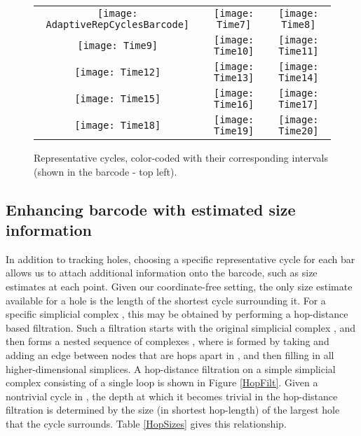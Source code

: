 \documentclass[12pt]{article}
\begin{document}
\begin{figure}[htp]
\begin{center}
\begin{tabular}{ccc}
\texttt{[image: AdaptiveRepCyclesBarcode]} & \texttt{[image: Time7]} & \texttt{[image: Time8]} \\
\texttt{[image: Time9]} & \texttt{[image: Time10]} & \texttt{[image: Time11]}  \\
\texttt{[image: Time12]} & \texttt{[image: Time13]} & \texttt{[image: Time14]} \\
\texttt{[image: Time15]} & \texttt{[image: Time16]} & \texttt{[image: Time17]} \\
\texttt{[image: Time18]} & \texttt{[image: Time19]} & \texttt{[image: Time20]} \\
\end{tabular}
\end{center}
\caption{Representative cycles, color-coded with their corresponding intervals (shown in the barcode - top left). \label{DenseNetwork}}
\end{figure}

\subsection{Enhancing barcode with estimated size information}

In addition to tracking holes, choosing a specific representative cycle for each bar allows us to attach additional information onto the barcode, such as size estimates at each point. Given our coordinate-free setting, the only size estimate available for a hole is the length of the shortest cycle surrounding it. For a specific simplicial complex , this may be obtained by performing a hop-distance based filtration. Such a filtration starts with the original simplicial complex , and then forms a nested sequence of complexes , where  is formed by taking  and adding an edge between nodes that are  hops apart in , and then filling in all higher-dimensional simplices. A hop-distance filtration on a simple simplicial complex consisting of a single loop is shown in Figure \ref{HopFilt}. Given a nontrivial cycle in , the depth at which it becomes trivial in the hop-distance filtration is determined by the size (in shortest hop-length) of the largest hole that the cycle surrounds. Table \ref{HopSizes} gives this relationship.
\end{document}
